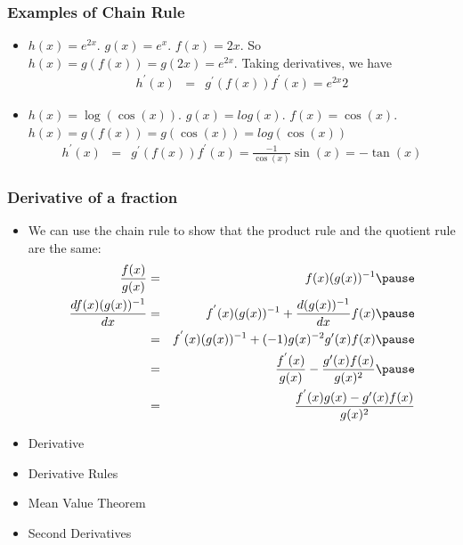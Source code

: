 \documentclass[aspectratio=169, handout]{beamer}
\numberwithin{equation}{section}
\begin{document}
\begin{frame}
\frametitle{Examples of Chain Rule}
\begin{itemize}
\item[-] $h(x) = e^{2x}$.  $g(x) = e^{x}$.  $f(x) = 2x$.  \pause So $h(x) = g(f(x)) = g(2x) = e^{2x}$.  Taking derivatives, we have \pause
\begin{eqnarray}
h^{'}(x) & = & g^{'}(f(x))f^{'}(x) = e^{2x}2 \nonumber 
\end{eqnarray} \pause
\item[-] $h(x) = \log(\cos(x) )$.  $g(x) = log(x)$.  $f(x) = \cos(x)$. \pause\\
 $h(x) = g(f(x)) = g( \cos(x)) = log(\cos(x))$  \pause
\begin{eqnarray}
h^{'}(x) & = & g^{'}(f(x))f^{'}(x) = \frac{-1}{\cos(x)} \sin(x) = -\tan (x) \nonumber 
\end{eqnarray}
\end{itemize}

\end{frame}

\begin{frame}
\frametitle{Derivative of a fraction}

\begin{itemize}
\item We can use the chain rule to show that the product rule and the quotient rule are the same:
\begin{eqnarray}
\frac{f(x) }{g(x) }& = &f(x) (g(x))^{-1} \nonumber \pause\\
 \frac{d f(x) (g(x))^{-1}}{dx}& = & f^{'}(x) (g(x))^{-1} +\frac{d(g(x))^{-1}}{dx} f(x)\nonumber  \pause\\
& = & f^{'}(x) (g(x))^{-1} +(-1)g(x)^{-2}g'(x) f(x) \nonumber  \pause\\
    & = & \frac{f^{'}(x)}{ g(x)} - \frac{g'(x) f(x)}{g(x)^{2}} \nonumber  \pause\\
        & = & \frac{f^{'}(x)g(x)-g'(x) f(x)}{g(x)^{2}} \nonumber 
  \end{eqnarray}
 \end{itemize}

\end{frame}



\begin{frame}

\begin{itemize}
\item \textcolor{mygray}{Derivative}
\item \textcolor{mygray}{Derivative Rules}
\item \textcolor{myblack}{Mean Value Theorem}
\item \textcolor{mygray}{Second Derivatives}
\end{itemize}

\end{frame}
\end{document}
